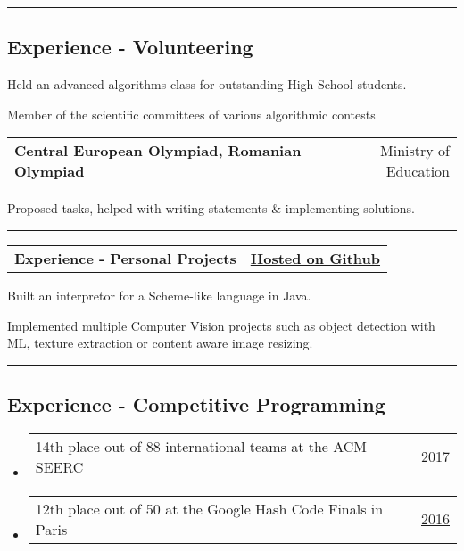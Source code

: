 \documentclass[10pt,letterpaper]{article}
\makeatletter
\newcommand{\headerrow}[2]
{\begin{tabular*}{\linewidth}{l@{\extracolsep{\fill}}r}
	#1 &
	#2 \\
\end{tabular*}}
\makeatother
\begin{document}
\hrule
\vspace{-1em}
\subsection*{Experience - Volunteering}
\vspace{-0.4em}

\begin{itemize*}

	\item Held an advanced algorithms class for outstanding High School students.

	\item
		{Member of the scientific committees of various algorithmic contests}

	\headerrow
		{\textbf{Central European Olympiad, Romanian Olympiad}}
		{Ministry of Education}

\vspace{-0.6em}


	\begin{itemize*}
		\item Proposed tasks, helped with writing statements \& implementing solutions.
	\end{itemize*}

\end{itemize*}


\hrule

\vspace{-0.3em}


\begin{flushleft}
\headerrow
	{\textbf{\large{Experience - Personal Projects}}}
	{\textbf{\href{https://github.com/ericpts}{Hosted on Github}}}

\end{flushleft}
	\begin{itemize*}
        \item Built an interpretor for a Scheme-like language in Java.
		\item Implemented multiple Computer Vision projects such as object detection with ML, texture extraction or content aware image resizing.
	\end{itemize*}



\hrule

\vspace{-1em}

\subsection*{Experience - Competitive Programming}
\begin{itemize}
	\parskip=0.1em
		\item
		\headerrow
			{14th place out of 88 international teams at the ACM SEERC}
			{2017}

		\item
		\headerrow
			{12th place out of 50 at the Google Hash Code Finals in Paris}
            {\href{https://hashcode.withgoogle.com/hashcode_2016.html}{2016}}

\end{itemize}
\end{document}
